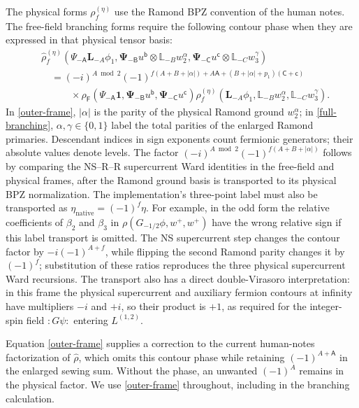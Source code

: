 \documentclass[12pt]{article}
\numberwithin{equation}{section}
\begin{document}
The physical forms $\rho_f^{(\eta)}$ use the Ramond BPZ convention of
the human notes.  The free-field branching forms require the following
contour phase when they are expressed in that physical tensor basis:
\begin{align}
 &\hat\rho_f^{(\eta)}(
 \Psi_{-\mathsf A}\mathbf L_{-A}\phi_1,
 \boldsymbol\Psi_{-\mathsf B}u^{\mathsf b}\otimes\mathbb L_{-B}w_2^\alpha,
 \boldsymbol\Psi_{-\mathsf C}u^{\mathsf c}\otimes\mathbb L_{-C}w_3^\gamma)
 \nonumber\\
 &\quad=(-i)^{A\bmod2}
 (-1)^{f(A+B+|\alpha|)+A\mathsf A+(B+|\alpha|+p_1)(\mathsf C+\mathsf c)}
 \nonumber\\
 &\qquad\quad\times
 \rho_{\mathsf F}(\Psi_{-\mathsf A}\mathbf1,
 \boldsymbol\Psi_{-\mathsf B}u^{\mathsf b},
 \boldsymbol\Psi_{-\mathsf C}u^{\mathsf c})
 \rho_f^{(\eta)}(\mathbf L_{-A}\phi_1,
 \mathbb L_{-B}w_2^\alpha,\mathbb L_{-C}w_3^\gamma).
 \label{outer-frame}
\end{align}
In \eqref{outer-frame}, $|\alpha|$ is the parity of the physical Ramond
ground $w_2^\alpha$; in \eqref{full-branching},
$\alpha,\gamma\in\{0,1\}$ label the total parities of the enlarged
Ramond primaries.  Descendant indices in sign exponents count fermionic
generators; their absolute values denote levels.  The factor
$(-i)^{A\bmod2}(-1)^{f(A+B+|\alpha|)}$ follows by comparing the
NS--R--R supercurrent Ward identities in the free-field and physical
frames, after the Ramond ground basis is transported to its physical
BPZ normalization.  The implementation's three-point label must also be
transported as $\eta_{\mathrm{native}}=(-1)^f\eta$.
For example, in the odd form the relative coefficients of $\beta_2$
and $\beta_3$ in $\rho(G_{-1/2}\phi,w^+,w^+)$ have the wrong relative
sign if this label transport is omitted.
The NS supercurrent step changes the contour factor by
$-i(-1)^{A+f}$, while flipping the second Ramond parity changes it by
$(-1)^f$; substitution of these ratios reproduces the three physical
supercurrent Ward recursions.  The transport also has a direct
double-Virasoro interpretation: in this frame the physical supercurrent
and auxiliary fermion contours at infinity have multipliers $-i$ and
$+i$, so their product is $+1$, as required for the integer-spin field
$:G\psi:$ entering $L^{(1,2)}$.

Equation \eqref{outer-frame} supplies a correction to the current
human-notes factorization of $\hat\rho$, which omits this contour phase
while retaining $(-1)^{A+\mathsf A}$ in the enlarged sewing sum.
Without the phase, an unwanted $(-1)^A$ remains in the physical factor.
We use \eqref{outer-frame} throughout, including in the branching calculation.
\end{document}
